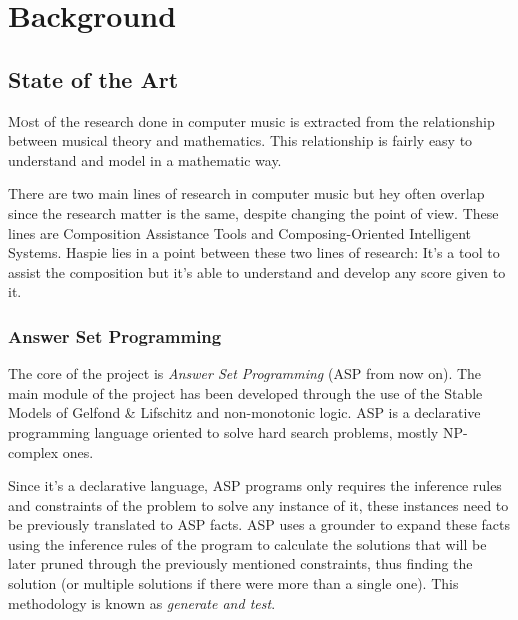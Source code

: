 \chapter{Background}
\label{chap:background}
\vspace{0.5cm}


\section{State of the Art}
\label{sec:state-of-the-art}

\lettrine{M}ost of the research done in computer music is extracted from the relationship between musical theory and mathematics. This relationship is fairly easy to understand and model in a mathematic way.

There are two main lines of research in computer music but hey often overlap since the research matter is the same, despite changing the point of view. These lines are Composition Assistance Tools and Composing-Oriented Intelligent Systems. Haspie lies in a point between these two lines of research: It's a tool to assist the composition but it's able to understand and develop any score given to it.

\subsection{Answer Set Programming}
\label{subsec:asp}

The core of the project is \textit{Answer Set Programming}\cite{Brewka:2011:ASP:2043174.2043195} (ASP from now on). The main module of the project has been developed through the use of the Stable Models of Gelfond \& Lifschitz\cite{Gelfond88thestable} and non-monotonic logic. ASP is a declarative programming language oriented to solve hard search problems, mostly NP-complex ones.

Since it's a declarative language, ASP programs only requires the inference rules and constraints of the problem to solve any instance of it, these instances need to be previously translated to ASP facts. ASP uses a grounder to expand these facts using the inference rules of the program to calculate the solutions that will be later pruned through the previously mentioned constraints, thus finding the solution (or multiple solutions if there were more than a single one). This methodology is known as \textit{generate and test}.

